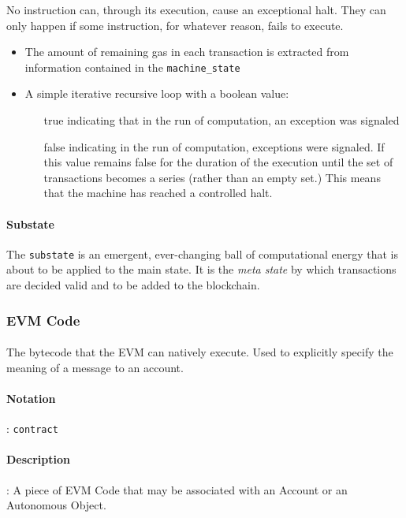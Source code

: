 \documentclass[10pt,a4paper,leqno,bibliography=totoc]{scrartcl}
\newenvironment{alphafootnotes}
{\par\edef\savedfootnotenumber{\number\value{footnote}}
\renewcommand{\thefootnote}{\alph{footnote}}
\setcounter{footnote}{0}}
{\par\setcounter{footnote}{\savedfootnotenumber}}
\begin{document}
\begin{alphafootnotes}
\begin{multicols*}{2}
		No instruction can, through its execution, cause an exceptional halt. They can only happen if some instruction, for whatever reason, fails to execute.
		
		\begin{itemize}
			\item The amount of remaining gas in each transaction is extracted from information contained in the \texttt{machine\_state} 
			\item A simple iterative recursive  loop\supercite{Wood2017} with a boolean  value: 
		\begin{itemize}
				\item[true] indicating that in the run of computation, an exception was signaled
				\item[false] indicating in the run of computation, exceptions were signaled. If this value remains false for the duration of the execution until the set of transactions becomes a series (rather than an empty set.) This means that the machine has reached a controlled halt. 
			\end{itemize}
		\end{itemize}
    	
				\paragraph{Substate}
					The \texttt{substate} is an emergent, ever-changing ball of computational energy that is about to be applied to the main state. It is the \textit{meta state} by which transactions are decided valid and to be added to the blockchain.
		
			\subsubsection{EVM Code}
				\paragraph{}The bytecode that the EVM can natively execute. Used to explicitly specify the meaning of a message to an account.
				\paragraph{Notation}: \texttt{contract}
				\paragraph{Description}: A piece of EVM Code that may be associated with an Account or an Autonomous Object. 


\end{multicols*}
\end{alphafootnotes}
\end{document}
